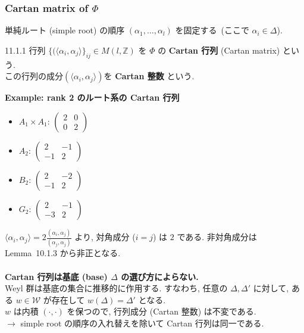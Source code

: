 \documentclass[uplatex,dvipdfmx]{jsarticle}
\begin{document}
\subsubsection{Cartan matrix of \texorpdfstring{$\Phi$}{Phi}}
単純ルート (simple root) の順序 $(\alpha_1, \dots, \alpha_l)$ を固定する~(ここで $\alpha_i \in \Delta$).
\begin{mydef}{11.1.1}
    行列 $\{(\langle \alpha_i, \alpha_j \rangle\}_{ij} \in M(l, \mathbb{Z})$ を $\Phi$ の \textbf{Cartan 行列} (Cartan matrix) という.\\
    この行列の成分$(\langle \alpha_i, \alpha_j \rangle)$を \textbf{Cartan 整数} という.
\end{mydef}
\vspace{0.5em}
\noindent\textbf{Example: rank 2 のルート系の Cartan 行列}
\begin{itemize}
    \item $A_1 \times A_1$: $\begin{pmatrix} 2 & 0 \\ 0 & 2 \end{pmatrix}$
    \item $A_2$: $\begin{pmatrix} 2 & -1 \\ -1 & 2 \end{pmatrix}$
    \item $B_2$: $\begin{pmatrix} 2 & -2 \\ -1 & 2 \end{pmatrix}$
    \item $G_2$: $\begin{pmatrix} 2 & -1 \\ -3 & 2 \end{pmatrix}$
\end{itemize}
$\langle \alpha_i, \alpha_j \rangle = 2 \frac{(\alpha_i, \alpha_j)}{(\alpha_j, \alpha_j)}$ より, 対角成分 ($i=j$) は $2$ である. 非対角成分はLemma~10.1.3 から非正となる.\\\\
\noindent\textbf{ Cartan 行列は基底 (base) $\Delta$ の選び方によらない.}\\
Weyl 群は基底の集合に推移的に作用する. すなわち, 任意の $\Delta, \Delta'$ に対して, ある $w \in \mathcal{W}$ が存在して $w(\Delta) = \Delta'$ となる.\\
$w$ は内積 $( \cdot, \cdot )$ を保つので, 行列成分 (Cartan 整数) は不変である.\\
$\longrightarrow$ simple root の順序の入れ替えを除いて Cartan 行列は同一である.\\\\
\end{document}
